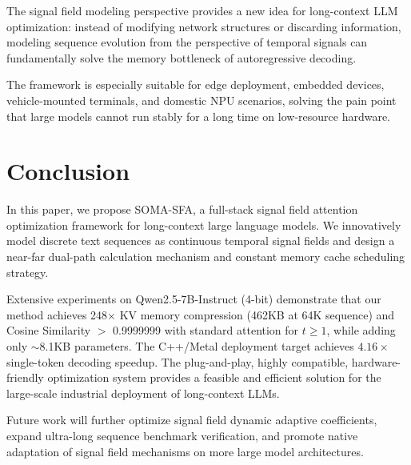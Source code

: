 \documentclass{article}
\begin{document}
The signal field modeling perspective provides a new idea for long-context LLM optimization: instead of modifying network structures or discarding information, modeling sequence evolution from the perspective of temporal signals can fundamentally solve the memory bottleneck of autoregressive decoding.

The framework is especially suitable for edge deployment, embedded devices, vehicle-mounted terminals, and domestic NPU scenarios, solving the pain point that large models cannot run stably for a long time on low-resource hardware.

\section{Conclusion}
In this paper, we propose SOMA-SFA, a full-stack signal field attention optimization framework for long-context large language models. We innovatively model discrete text sequences as continuous temporal signal fields and design a near-far dual-path calculation mechanism and constant memory cache scheduling strategy.

Extensive experiments on Qwen2.5-7B-Instruct (4-bit) demonstrate that our method achieves 248$\times$ KV memory compression (462KB at 64K sequence) and Cosine Similarity $>$ 0.9999999 with standard attention for $t \geq 1$, while adding only $\sim$8.1KB parameters. The C++/Metal deployment target achieves $4.16\times$ single-token decoding speedup. The plug-and-play, highly compatible, hardware-friendly optimization system provides a feasible and efficient solution for the large-scale industrial deployment of long-context LLMs.

Future work will further optimize signal field dynamic adaptive coefficients, expand ultra-long sequence benchmark verification, and promote native adaptation of signal field mechanisms on more large model architectures.
\end{document}
